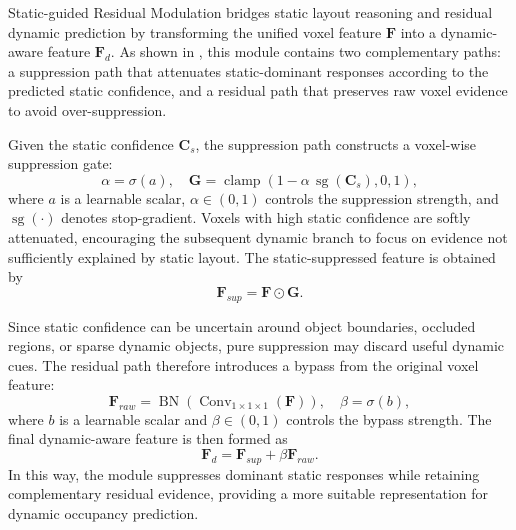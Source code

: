 Static-guided Residual Modulation bridges static layout reasoning and residual
dynamic prediction by transforming the unified voxel feature $\bm{F}$ into a
dynamic-aware feature $\bm{F}_{d}$. As shown in
, this module contains two complementary
paths: a suppression path that attenuates static-dominant responses according
to the predicted static confidence, and a residual path that preserves raw voxel
evidence to avoid over-suppression.

Given the static confidence $\bm{C}_{s}$, the suppression path constructs a
voxel-wise suppression gate:
\begin{equation}
  \alpha=\sigma(a),
  \quad
  \bm{G}
  =
  \operatorname{clamp}
  \left(1-\alpha\,\operatorname{sg}(\bm{C}_{s}),0,1\right),
\end{equation}
where $a$ is a learnable scalar, $\alpha\in(0,1)$ controls the suppression
strength, and $\operatorname{sg}(\cdot)$ denotes stop-gradient. Voxels with high
static confidence are softly attenuated, encouraging the subsequent dynamic
branch to focus on evidence not sufficiently explained by static layout. The
static-suppressed feature is obtained by
\begin{equation}
  \bm{F}_{sup}=\bm{F}\odot\bm{G}.
\end{equation}

Since static confidence can be uncertain around object boundaries, occluded
regions, or sparse dynamic objects, pure suppression may discard useful dynamic
cues. The residual path therefore introduces a bypass from the original voxel
feature:
\begin{equation}
  \bm{F}_{raw}
  =
  \operatorname{BN}
  \left(\operatorname{Conv}_{1\times1\times1}(\bm{F})\right),
  \quad
  \beta=\sigma(b),
\end{equation}
where $b$ is a learnable scalar and $\beta\in(0,1)$ controls the bypass
strength. The final dynamic-aware feature is then formed as
\begin{equation}
  \bm{F}_{d}
  =
  \bm{F}_{sup}+\beta\bm{F}_{raw}.
\end{equation}
In this way, the module suppresses dominant static responses while retaining
complementary residual evidence, providing a more suitable representation for
dynamic occupancy prediction.

